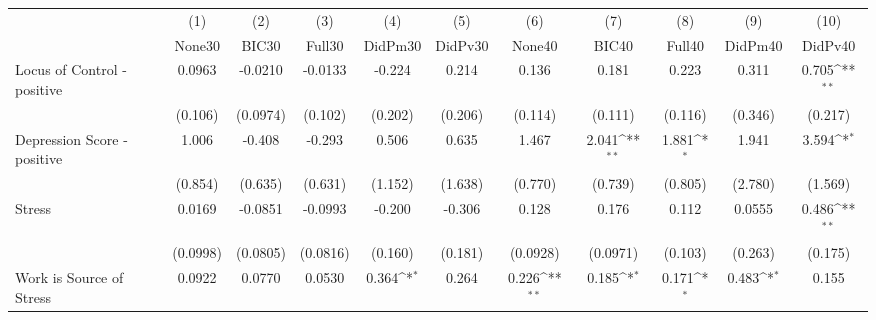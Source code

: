{
\def\sym#1{\ifmmode^{#1}\else\(^{#1}\)\fi}
\begin{tabular}{l*{10}{c}}
\toprule
            &\multicolumn{1}{c}{(1)}&\multicolumn{1}{c}{(2)}&\multicolumn{1}{c}{(3)}&\multicolumn{1}{c}{(4)}&\multicolumn{1}{c}{(5)}&\multicolumn{1}{c}{(6)}&\multicolumn{1}{c}{(7)}&\multicolumn{1}{c}{(8)}&\multicolumn{1}{c}{(9)}&\multicolumn{1}{c}{(10)}\\
            &\multicolumn{1}{c}{None30}&\multicolumn{1}{c}{BIC30}&\multicolumn{1}{c}{Full30}&\multicolumn{1}{c}{DidPm30}&\multicolumn{1}{c}{DidPv30}&\multicolumn{1}{c}{None40}&\multicolumn{1}{c}{BIC40}&\multicolumn{1}{c}{Full40}&\multicolumn{1}{c}{DidPm40}&\multicolumn{1}{c}{DidPv40}\\
\midrule
Locus of Control - positive&      0.0963         &     -0.0210         &     -0.0133         &      -0.224         &       0.214         &       0.136         &       0.181         &       0.223         &       0.311         &       0.705\sym{**} \\
            &     (0.106)         &    (0.0974)         &     (0.102)         &     (0.202)         &     (0.206)         &     (0.114)         &     (0.111)         &     (0.116)         &     (0.346)         &     (0.217)         \\
\addlinespace
Depression Score - positive&       1.006         &      -0.408         &      -0.293         &       0.506         &       0.635         &       1.467         &       2.041\sym{**} &       1.881\sym{*}  &       1.941         &       3.594\sym{*}  \\
            &     (0.854)         &     (0.635)         &     (0.631)         &     (1.152)         &     (1.638)         &     (0.770)         &     (0.739)         &     (0.805)         &     (2.780)         &     (1.569)         \\
\addlinespace
Stress      &      0.0169         &     -0.0851         &     -0.0993         &      -0.200         &      -0.306         &       0.128         &       0.176         &       0.112         &      0.0555         &       0.486\sym{**} \\
            &    (0.0998)         &    (0.0805)         &    (0.0816)         &     (0.160)         &     (0.181)         &    (0.0928)         &    (0.0971)         &     (0.103)         &     (0.263)         &     (0.175)         \\
\addlinespace
Work is Source of Stress&      0.0922         &      0.0770         &      0.0530         &       0.364\sym{*}  &       0.264         &       0.226\sym{**} &       0.185\sym{*}  &       0.171\sym{*}  &       0.483\sym{*}  &       0.155         \\

\end{tabular}}
